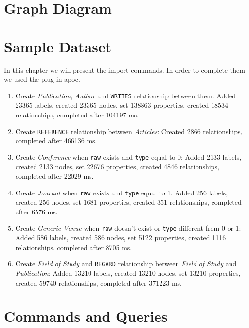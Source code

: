\documentclass{Configuration_Files/PoliMi3i_thesis}
\begin{document}
\chapter{Graph Diagram}

\chapter{Sample Dataset}
In this chapter we will present the import commands. In order to complete them we used the plug-in apoc.

\begin{enumerate}
    \item Create \emph{Publication}, \emph{Author} and \verb |WRITES| relationship between them: 
        Added 23365 labels, created 23365 nodes, set 138863 properties, created 18534 relationships, completed after 104197 ms.
    \item Create \verb |REFERENCE| relationship between \emph{Articles}: 
        Created 2866 relationships, completed after 466136 ms.
    \item Create \emph{Conference} when \verb |raw| exists and \verb |type| equal to 0: 
        Added 2133 labels, created 2133 nodes, set 22676 properties, created 4846 relationships, completed after 22029 ms.
    \item Create \emph{Journal} when \verb |raw| exists and \verb |type| equal to 1: 
        Added 256 labels, created 256 nodes, set 1681 properties, created 351 relationships, completed after 6576 ms.
    \item Create \emph{Generic Venue} when \verb |raw| doesn't exist or \verb |type| different from 0 or 1: 
        Added 586 labels, created 586 nodes, set 5122 properties, created 1116 relationships, completed after 8705 ms.
    \item Create \emph{Field of Study} and \verb |REGARD| relationship between \emph{Field of Study} and \emph{Publication}: 
        Added 13210 labels, created 13210 nodes, set 13210 properties, created 59740 relationships, completed after 371223 ms.
\end{enumerate}


\chapter{Commands and Queries}
\end{document}
